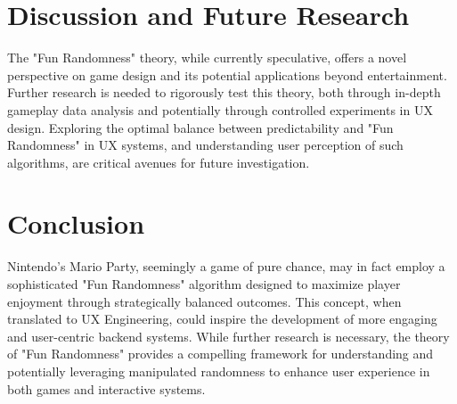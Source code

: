 \documentclass{article}
\begin{document}
\section{Discussion and Future Research}

The "Fun Randomness" theory, while currently speculative, offers a novel perspective on game design and its potential applications beyond entertainment.  Further research is needed to rigorously test this theory, both through in-depth gameplay data analysis and potentially through controlled experiments in UX design.  Exploring the optimal balance between predictability and "Fun Randomness" in UX systems, and understanding user perception of such algorithms, are critical avenues for future investigation.

\section{Conclusion}

Nintendo's Mario Party, seemingly a game of pure chance, may in fact employ a sophisticated "Fun Randomness" algorithm designed to maximize player enjoyment through strategically balanced outcomes.  This concept, when translated to UX Engineering, could inspire the development of more engaging and user-centric backend systems. While further research is necessary, the theory of "Fun Randomness" provides a compelling framework for understanding and potentially leveraging manipulated randomness to enhance user experience in both games and interactive systems.
\end{document}
